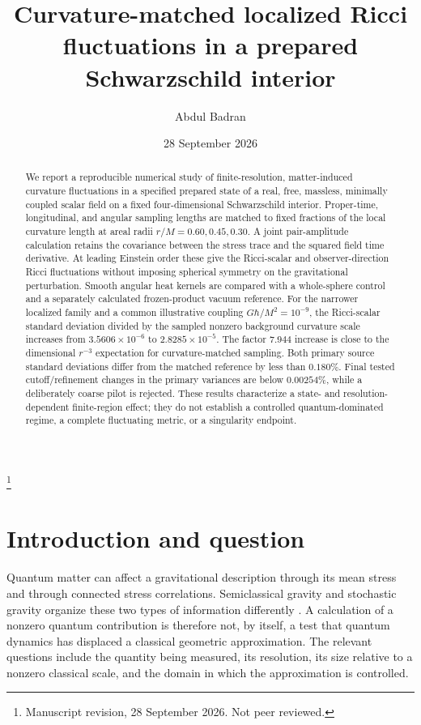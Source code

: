 \documentclass[aps,prd,reprint,floatfix,nofootinbib,longbibliography]{revtex4-2}
\begin{document}
\title{Curvature-matched localized Ricci fluctuations in a prepared Schwarzschild interior}
\author{Abdul Badran}
\thanks{Manuscript revision, 28 September 2026. Not peer reviewed.}
\date{28 September 2026}
\begin{abstract}
We report a reproducible numerical study of finite-resolution, matter-induced curvature fluctuations in a specified prepared state of a real, free, massless, minimally coupled scalar field on a fixed four-dimensional Schwarzschild interior. Proper-time, longitudinal, and angular sampling lengths are matched to fixed fractions of the local curvature length at areal radii $r/M=0.60,0.45,0.30$. A joint pair-amplitude calculation retains the covariance between the stress trace and the squared field time derivative. At leading Einstein order these give the Ricci-scalar and observer-direction Ricci fluctuations without imposing spherical symmetry on the gravitational perturbation. Smooth angular heat kernels are compared with a whole-sphere control and a separately calculated frozen-product vacuum reference. For the narrower localized family and a common illustrative coupling $G\hbar/M^2=10^{-9}$, the Ricci-scalar standard deviation divided by the sampled nonzero background curvature scale increases from $3.5606\times10^{-6}$ to $2.8285\times10^{-5}$. The factor $7.944$ increase is close to the dimensional $r^{-3}$ expectation for curvature-matched sampling. Both primary source standard deviations differ from the matched reference by less than $0.180\%$. Final tested cutoff/refinement changes in the primary variances are below $0.00254\%$, while a deliberately coarse pilot is rejected. These results characterize a state- and resolution-dependent finite-region effect; they do not establish a controlled quantum-dominated regime, a complete fluctuating metric, or a singularity endpoint.
\end{abstract}
\maketitle
\raggedbottom

\section{Introduction and question}
Quantum matter can affect a gravitational description through its mean stress and through connected stress correlations. Semiclassical gravity and stochastic gravity organize these two types of information differently \cite{HuVerdaguer2008,PhillipsHu2001}. A calculation of a nonzero quantum contribution is therefore not, by itself, a test that quantum dynamics has displaced a classical geometric approximation. The relevant questions include the quantity being measured, its resolution, its size relative to a nonzero classical scale, and the domain in which the approximation is controlled.
\end{document}
